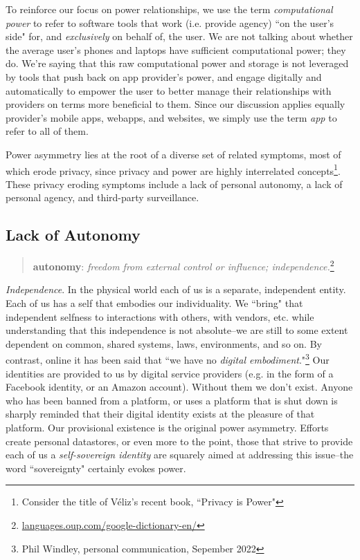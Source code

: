 \documentclass[11pt, oneside]{article}   	%
\newcommand{\hyperfootnote}[1][]{\def\ArgI{{#1}}\hyperfootnoteRelay}
\newcommand\hyperfootnoteRelay[2][]{\href{#1#2}{\ArgI}\footnote{\href{#1#2}{#2}}}
\begin{document}
To reinforce our focus on power relationships, we use the term \emph{computational power} to refer to software tools that work (i.e. provide agency) ``on the user's side" for, and \emph{exclusively} on behalf of, the user. We are not talking about whether the average user's phones and laptops have sufficient computational power; they do. We're saying that this raw computational power and storage is not leveraged by tools that push back on app provider's power, and engage digitally and automatically to empower the user to better manage their relationships with providers on terms more beneficial to them. Since our discussion applies equally provider's mobile apps, webapps, and websites, we simply use the term \emph{app} to refer to all of them.

Power asymmetry lies at the root of a diverse set of related symptoms, most of which erode privacy, since privacy and power are highly interrelated concepts\footnote{Consider the title of V\'eliz's recent book, ``Privacy is Power"\cite{veliz2020}}. 
These privacy eroding symptoms include a lack of personal autonomy, a lack of personal agency, and third-party surveillance. 

\subsection{Lack of Autonomy}

\begin{quote}
\textbf{au\hspace{0.5mm}\tiny {}\normalsize \hspace{0.5mm}ton\hspace{0.5mm}\tiny {}\normalsize \hspace{0.5mm}o\hspace{0.5mm}\tiny {}\normalsize \hspace{0.5mm}my}: \emph{freedom from external control or influence; independence.}\hyperfootnote[][https://]{languages.oup.com/google-dictionary-en/}
\end{quote}

\emph{Independence}. In the physical world each of us is a separate, independent entity. Each of us has a self that embodies our individuality. We ``bring" that independent selfness to interactions with others, with vendors, etc. while understanding that this independence is not absolute--we are still to some extent dependent on common, shared systems, laws, environments, and so on. By contrast, online it has been said that ``we have no \emph{digital embodiment}."\footnote{Phil Windley, personal communication, Sepember 2022}  Our identities are provided to us by digital service providers (e.g. in the form of a Facebook identity, or an Amazon account). Without them we don't exist. Anyone who has been banned from a platform, or uses a platform that is shut down is sharply reminded that their digital identity exists at the pleasure of that platform. Our provisional existence is the original power asymmetry. Efforts create personal datastores, or even more to the point, those that strive to provide each of us a \emph{self-sovereign identity}\cite{Preukschat2021} are squarely aimed at addressing this issue--the word ``sovereignty" certainly evokes power.
\end{document}
